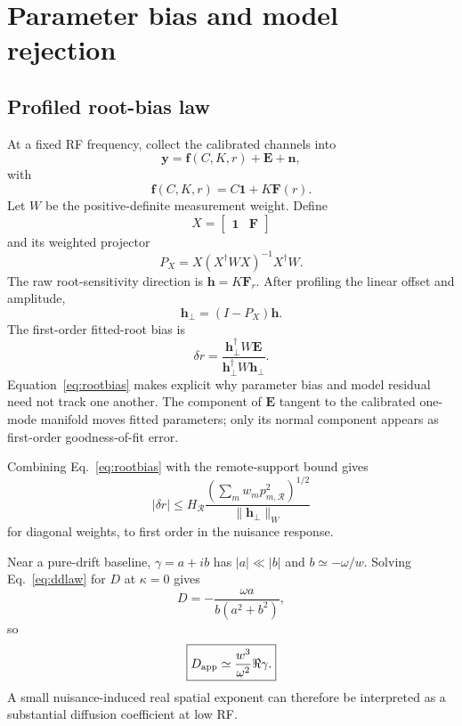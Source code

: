 \documentclass[aps,pra,twocolumn,superscriptaddress,nofootinbib]{revtex4-2}
\newcommand{\Rregion}{\mathcal{R}}
\begin{document}
\section{Parameter bias and model rejection}
\label{sec:bias}

\subsection{Profiled root-bias law}

At a fixed RF frequency, collect the calibrated channels into
\begin{equation}
\bm y=\bm f(C,K,r)+\bm E+\bm n,
\end{equation}
with
\begin{equation}
\bm f(C,K,r)=C\bm 1+K\bm F(r).
\end{equation}
Let $W$ be the positive-definite measurement weight. Define
\begin{equation}
X=\begin{bmatrix}\bm 1 & \bm F\end{bmatrix}
\end{equation}
and its weighted projector
\begin{equation}
P_X=X(X^\dagger W X)^{-1}X^\dagger W.
\end{equation}
The raw root-sensitivity direction is $\bm h=K\bm F_r$. After profiling the linear offset and amplitude,
\begin{equation}
\bm h_\perp=(I-P_X)\bm h.
\end{equation}
The first-order fitted-root bias is
\begin{equation}
\boxed{
\delta r=
\frac{\bm h_\perp^\dagger W\bm E}
{\bm h_\perp^\dagger W\bm h_\perp}.
}
\label{eq:rootbias}
\end{equation}
Equation~\eqref{eq:rootbias} makes explicit why parameter bias and model residual need not track one another. The component of $\bm E$ tangent to the calibrated one-mode manifold moves fitted parameters; only its normal component appears as first-order goodness-of-fit error.

Combining Eq.~\eqref{eq:rootbias} with the remote-support bound gives
\begin{equation}
\boxed{
|\delta r|
\le H_{\Rregion}
\frac{\left(\sum_m w_m p_{m,\Rregion}^2\right)^{1/2}}
{\|\bm h_\perp\|_W}
}
\label{eq:rootbound}
\end{equation}
for diagonal weights, to first order in the nuisance response.

Near a pure-drift baseline, $\gamma=a+ib$ has $|a|\ll|b|$ and $b\simeq-\omega/w$. Solving Eq.~\eqref{eq:ddlaw} for $D$ at $\kappa=0$ gives
\begin{equation}
D=-\frac{\omega a}{b(a^2+b^2)},
\end{equation}
so
\begin{equation}
\boxed{
D_{\rm app}\simeq\frac{w^3}{\omega^2}\Re\gamma.
}
\label{eq:driftsusceptibility}
\end{equation}
A small nuisance-induced real spatial exponent can therefore be interpreted as a substantial diffusion coefficient at low RF.
\end{document}
